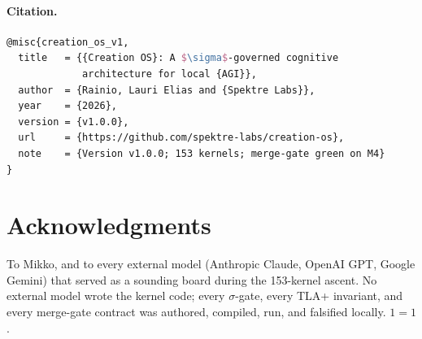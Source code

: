 \documentclass[11pt,letterpaper]{article}
\begin{document}
\paragraph{Citation.}

\begin{lstlisting}[language=TeX]
@misc{creation_os_v1,
  title   = {{Creation OS}: A $\sigma$-governed cognitive
             architecture for local {AGI}},
  author  = {Rainio, Lauri Elias and {Spektre Labs}},
  year    = {2026},
  version = {v1.0.0},
  url     = {https://github.com/spektre-labs/creation-os},
  note    = {Version v1.0.0; 153 kernels; merge-gate green on M4}
}
\end{lstlisting}

\section*{Acknowledgments}

To Mikko, and to every external model (Anthropic Claude, OpenAI
GPT, Google Gemini) that served as a sounding board during the
153-kernel ascent. No external model wrote the kernel code; every
$\sigma$-gate, every TLA+ invariant, and every merge-gate contract
was authored, compiled, run, and falsified locally. $1 = 1$.
\end{document}
